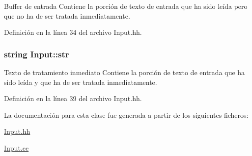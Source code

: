 Buffer de entrada Contiene la porción de texto de entrada que ha sido leída pero que no ha de ser tratada inmediatamente. 



Definición en la línea 34 del archivo Input.\+hh.

\subsubsection[{\texorpdfstring{str}{str}}]{\setlength{\rightskip}{0pt plus 5cm}string Input\+::str\hspace{0.3cm}{\ttfamily [private]}}\hypertarget{class_input_a0c2550eda9a6250028748d8870f4e83f}{}\label{class_input_a0c2550eda9a6250028748d8870f4e83f}


Texto de tratamiento inmediato Contiene la porción de texto de entrada que ha sido leída y que ha de ser tratada inmediatamente. 



Definición en la línea 39 del archivo Input.\+hh.



La documentación para esta clase fue generada a partir de los siguientes ficheros\+:\begin{DoxyCompactItemize}
\item 
\hyperlink{_input_8hh}{Input.\+hh}\item 
\hyperlink{_input_8cc}{Input.\+cc}\end{DoxyCompactItemize}
